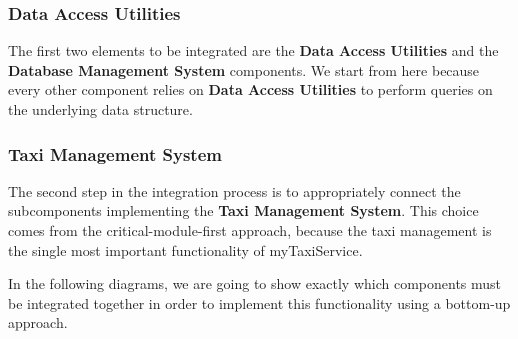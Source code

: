 \subsubsection*{Data Access Utilities}
The first two elements to be integrated are the \textbf{Data Access Utilities} and the \textbf{Database Management System} components. We start from here because every other component relies on \textbf{Data Access Utilities} to perform queries on the underlying data structure. 
\begin{figure}[H]
\centering
{}
\end{figure}
\subsubsection*{Taxi Management System}
The second step in the integration process is to appropriately connect the subcomponents implementing the \textbf{Taxi Management System}. This choice comes from the critical-module-first approach, because the taxi management is the single most important functionality of myTaxiService.

In the following diagrams, we are going to show exactly which components must be integrated together in order to implement this functionality using a bottom-up approach.

